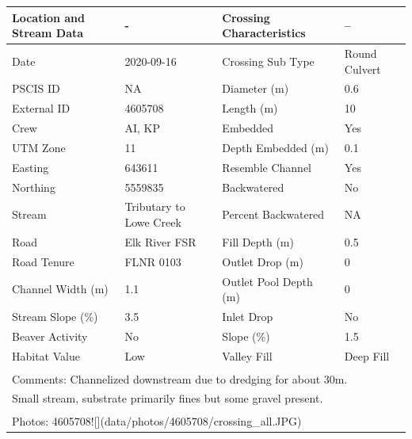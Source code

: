 \documentclass[
]{book}
\begin{document}
\begin{tabular}{l|l|l|l}
\hline
Location and Stream Data & - & Crossing Characteristics & --\\
\hline
Date & 2020-09-16 & Crossing Sub Type & Round Culvert\\
\hline
PSCIS ID & NA & Diameter (m) & 0.6\\
\hline
External ID & 4605708 & Length (m) & 10\\
\hline
Crew & AI, KP & Embedded & Yes\\
\hline
UTM Zone & 11 & Depth Embedded (m) & 0.1\\
\hline
Easting & 643611 & Resemble Channel & Yes\\
\hline
Northing & 5559835 & Backwatered & No\\
\hline
Stream & Tributary to Lowe Creek & Percent Backwatered & NA\\
\hline
Road & Elk River FSR & Fill Depth (m) & 0.5\\
\hline
Road Tenure & FLNR 0103 & Outlet Drop (m) & 0\\
\hline
Channel Width (m) & 1.1 & Outlet Pool Depth (m) & 0\\
\hline
Stream Slope (\%) & 3.5 & Inlet Drop & No\\
\hline
Beaver Activity & No & Slope (\%) & 1.5\\
\hline
Habitat Value & Low & Valley Fill & Deep Fill\\
\hline
\multicolumn{4}{l}{\textsuperscript{} Comments: Channelized downstream due to dredging for about 30m.}\\
\multicolumn{4}{l}{Small stream, substrate primarily fines but some gravel present.}\\
\multicolumn{4}{l}{\textsuperscript{} Photos: 4605708![](data/photos/4605708/crossing\_all.JPG)}\\
\end{tabular}
\end{document}

